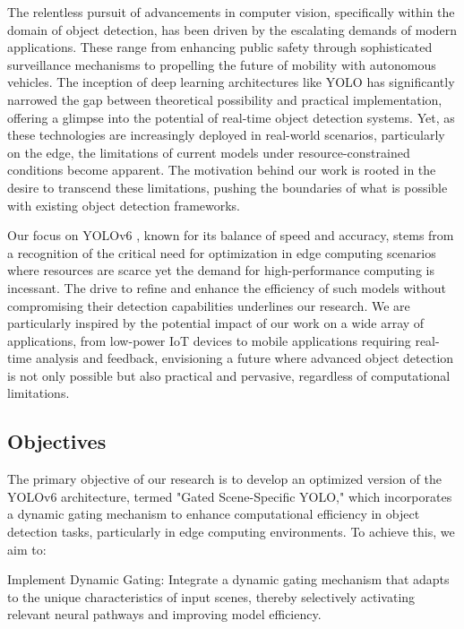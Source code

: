 The relentless pursuit of advancements in computer vision, specifically within the domain of object detection, has been driven by the escalating demands of modern applications. These range from enhancing public safety through sophisticated surveillance mechanisms to propelling the future of mobility with autonomous vehicles. The inception of deep learning architectures like YOLO has significantly narrowed the gap between theoretical possibility and practical implementation, offering a glimpse into the potential of real-time object detection systems. Yet, as these technologies are increasingly deployed in real-world scenarios, particularly on the edge, the limitations of current models under resource-constrained conditions become apparent. The motivation behind our work is rooted in the desire to transcend these limitations, pushing the boundaries of what is possible with existing object detection frameworks.

Our focus on YOLOv6 \cite{li2022yolov6,li2023yolov6}, known for its balance of speed and accuracy, stems from a recognition of the critical need for optimization in edge computing scenarios where resources are scarce yet the demand for high-performance computing is incessant. The drive to refine and enhance the efficiency of such models without compromising their detection capabilities underlines our research. We are particularly inspired by the potential impact of our work on a wide array of applications, from low-power IoT devices to mobile applications requiring real-time analysis and feedback, envisioning a future where advanced object detection is not only possible but also practical and pervasive, regardless of computational limitations.

\subsection{Objectives}

The primary objective of our research is to develop an optimized version of the YOLOv6 \cite{li2022yolov6,li2023yolov6} architecture, termed "Gated Scene-Specific YOLO," which incorporates a dynamic gating mechanism to enhance computational efficiency in object detection tasks, particularly in edge computing environments. To achieve this, we aim to:

Implement Dynamic Gating: Integrate a dynamic gating mechanism that adapts to the unique characteristics of input scenes, thereby selectively activating relevant neural pathways and improving model efficiency.

